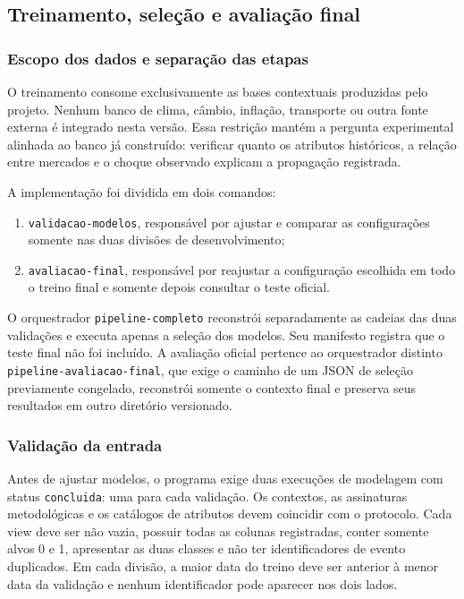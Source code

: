 \documentclass[12pt,a4paper]{article}
\begin{document}
\subsection{Treinamento, seleção e avaliação final}

\subsubsection{Escopo dos dados e separação das etapas}

O treinamento consome exclusivamente as bases contextuais produzidas pelo
projeto. Nenhum banco de clima, câmbio, inflação, transporte ou outra fonte
externa é integrado nesta versão.
Essa restrição mantém a pergunta experimental alinhada ao banco já construído:
verificar quanto os atributos históricos, a relação entre mercados e o choque
observado explicam a propagação registrada.

A implementação foi dividida em dois comandos:

\begin{enumerate}
    \item \texttt{validacao-modelos}, responsável por ajustar e comparar as
    configurações somente nas duas divisões de desenvolvimento;
    \item \texttt{avaliacao-final}, responsável por reajustar a configuração
    escolhida em todo o treino final e somente depois consultar o teste oficial.
\end{enumerate}

O orquestrador \texttt{pipeline-completo} reconstrói separadamente as cadeias
das duas validações e executa apenas a seleção dos modelos. Seu manifesto
registra que o teste final não foi incluído. A avaliação oficial pertence ao
orquestrador distinto \texttt{pipeline-avaliacao-final}, que exige o caminho de
um JSON de seleção previamente congelado, reconstrói somente o contexto final e
preserva seus resultados em outro diretório versionado.

\subsubsection{Validação da entrada}

Antes de ajustar modelos, o programa exige duas execuções de modelagem com
status \texttt{concluida}: uma para cada validação. Os contextos, as assinaturas
metodológicas e os catálogos de atributos devem coincidir com o protocolo. Cada
view deve ser não vazia, possuir todas as colunas registradas, conter somente
alvos 0 e 1, apresentar as duas classes e não ter identificadores de evento
duplicados. Em cada divisão, a maior data do treino deve ser anterior à menor
data da validação e nenhum identificador pode aparecer nos dois lados.
\end{document}
